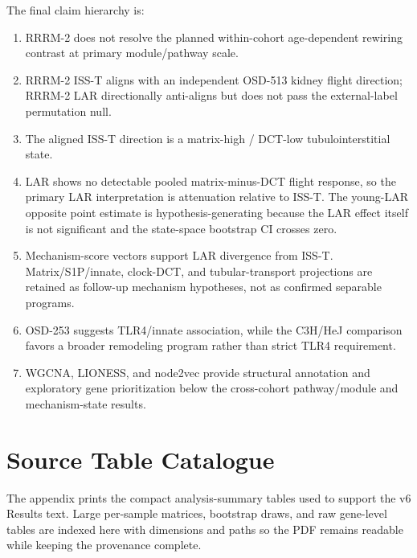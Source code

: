 \documentclass[11pt]{article}
\begin{document}
The final claim hierarchy is:
\begin{enumerate}
  \item RRRM-2 does not resolve the planned within-cohort age-dependent rewiring contrast at primary module/pathway scale.
  \item RRRM-2 ISS-T aligns with an independent OSD-513 kidney flight direction; RRRM-2 LAR directionally anti-aligns but does not pass the external-label permutation null.
  \item The aligned ISS-T direction is a matrix-high / DCT-low tubulointerstitial state.
  \item LAR shows no detectable pooled matrix-minus-DCT flight response, so the primary LAR interpretation is attenuation relative to ISS-T. The young-LAR opposite point estimate is hypothesis-generating because the LAR effect itself is not significant and the state-space bootstrap CI crosses zero.
  \item Mechanism-score vectors support LAR divergence from ISS-T. Matrix/S1P/innate, clock-DCT, and tubular-transport projections are retained as follow-up mechanism hypotheses, not as confirmed separable programs.
  \item OSD-253 suggests TLR4/innate association, while the C3H/HeJ comparison favors a broader remodeling program rather than strict TLR4 requirement.
  \item WGCNA, LIONESS, and node2vec provide structural annotation and exploratory gene prioritization below the cross-cohort pathway/module and mechanism-state results.
\end{enumerate}
\clearpage

\section*{Source Table Catalogue}
\noindent The appendix prints the compact analysis-summary tables used to support the v6 Results text. Large per-sample matrices, bootstrap draws, and raw gene-level tables are indexed here with dimensions and paths so the PDF remains readable while keeping the provenance complete.
\end{document}
